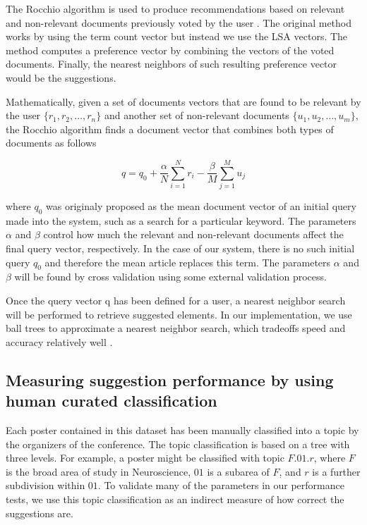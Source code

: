 \documentclass[a4paper]{article}
\begin{document}
The Rocchio algorithm is used to produce recommendations based on relevant and non-relevant documents previously voted by the user \cite{rocchio1971relevance}. The original method works by using the term count vector but instead we use the LSA vectors. The method computes a preference vector by combining the vectors of the voted documents. Finally, the nearest neighbors of such resulting preference vector would be the suggestions.


Mathematically, given a set of documents vectors that are found to be relevant by the user $\{r_1, r_2, \ldots, r_n\}$ and another set of non-relevant documents $\{u_1, u_2, \ldots, u_m\}$, the Rocchio algorithm finds a document vector that combines both types of documents as follows


\begin{equation} \label{eq:1}
 q = q_0 + \frac{\alpha}{N} \sum_{i=1}^N r_i - \frac{\beta}{M} \sum_{j=1}^M u_j
\end{equation}

where $q_0$ was originaly proposed as the mean document vector of an initial query made into the system, such as a search for a particular keyword. The parameters $\alpha$ and $\beta$ control how much the relevant and non-relevant documents affect the final query vector, respectively. In the case of our system, there is no such initial query $q_0$ and therefore the mean article replaces this term. The parameters $\alpha$ and $\beta$ will be found by cross validation using some external validation process.


Once the query vector q has been defined for a user, a nearest neighbor search will be performed to retrieve suggested elements. In our implementation, we use ball trees to approximate a nearest neighbor search, which tradeoffs speed and accuracy relatively well \cite{shakhnarovish2005indyk}.

\subsection{Measuring suggestion performance by using human curated classification}

Each poster contained in this dataset has been manually classified into a topic by the organizers of the conference. The topic classification is based on a tree with three levels. For example, a poster might be classified with topic $F.01.r$, where $F$ is the broad area of study in Neuroscience, $01$ is a subarea of $F$, and $r$ is a further subdivision within $01$.  To validate many of the parameters in our performance tests, we use this topic classification as an indirect measure of how correct the suggestions are.
\end{document}

